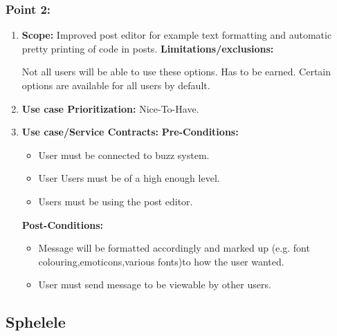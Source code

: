 \documentclass[11pt]{article}
\begin{document}
\subsubsection{Point 2:} 
\begin{enumerate}
\item 
\textbf{Scope:}
Improved post editor for example text formatting and automatic pretty printing of code in posts.
\newline
\textbf{Limitations/exclusions:} 

Not all users will be able to use these options. Has to be earned. Certain options are available for all users by default.

\item 
\textbf{Use case Prioritization:} Nice-To-Have.

\item 
\textbf{Use case/Service Contracts:} 
\newline
\textbf{Pre-Conditions: }
\begin{itemize}
\item User must be connected to buzz system.
\item User Users must be of a high enough level.
\item Users must be using the post editor.
\end{itemize}
 

\textbf{Post-Conditions: }
\begin{itemize}

\item Message will be formatted accordingly and marked up (e.g. font colouring,emoticons,various fonts)to how the user wanted. 
\item User must send message to be viewable by other users.
\end{itemize}
\end{enumerate}

\subsection{Sphelele}
\end{document}
